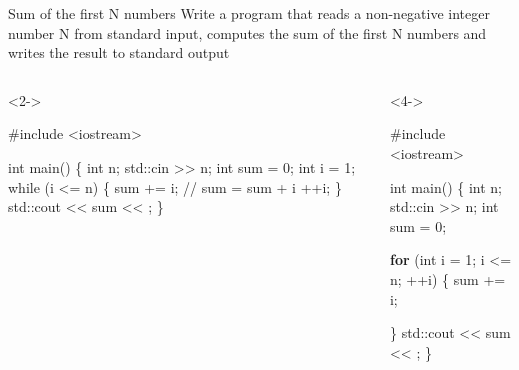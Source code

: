 \begin{frame}[fragile]{Sum of the first N numbers}
  Write a program that reads a non-negative integer number N from standard
  input, computes the sum of the first N numbers and writes the result to
  standard output

  \begin{columns}[T]

    \begin{column}{.5\textwidth}
      \begin{codeblock}<2->{
#include <iostream>

int main()
\{
  int n;
  std::cin >{}> n;
  int sum = 0;
  \alert<3->{int i = 1;}
  while (\alert<3->{i <= n}) \{
    sum += i;   // sum = sum + i
    \alert<3->{++i};
  \}
  std::cout <{}< sum <{}< \bslashn;
\}}\end{codeblock}

    \end{column}

    \begin{column}{.5\textwidth}
      \begin{codeblock}<4->{
#include <iostream>

int main()
\{
  int n;
  std::cin >{}> n;
  int sum = 0;

  \textbf<4>{for} (\alert<4>{int i = 1}; \alert<4>{i <= n}; \alert<4>{++i}) \{
    sum += i;

  \}
  std::cout <{}< sum <{}< \bslashn;
\}}\end{codeblock}
    \end{column}

  \end{columns}
\end{frame}

